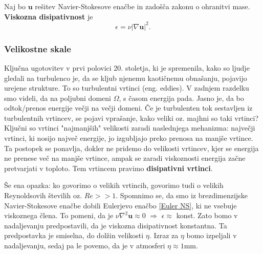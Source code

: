 \documentclass[mat2, tisk]{fmfdelo}
\newcommand{\bd}{\textbf}
\begin{document}
\begin{definicija}
Naj bo $\bd{u}$ rešitev Navier-Stokesove enačbe in zadošča zakonu o ohranitvi mase. \textbf{Viskozna disipativnost} je 
\begin{equation}
\epsilon = \nu|\nabla \bd{u}|^2.
\end{equation}
\end{definicija}

\subsubsection{Velikostne skale}
Ključna ugotovitev v prvi polovici 20. stoletja, ki je spremenila, kako so ljudje gledali 
na turbulenco je, da se kljub njenemu kaotičnemu obnašanju, pojavijo urejene strukture. 
To so turbulentni vrtinci (eng. eddies). V zadnjem razdelku smo videli, da na poljubni domeni 
$\Omega$, s časom energija pada. Jasno je, da bo odtok/prenos energije večji na večji domeni. Če je turbulenten 
tok sestavljen iz turbulentnih vrtincev, se pojavi vprašanje, kako veliki oz. majhni so taki vrtinci? 
Ključni so vrtinci "najmanjših" velikosti zaradi naslednjega mehanizma:
največji vrtinci, ki nosijo največ energije, jo izgubljajo preko prenosa na manjše vrtince. Ta postopek se ponavlja, dokler 
ne pridemo do velikosti vrtincev, kjer se energija ne prenese več na manjše vrtince, 
ampak se zaradi viskoznosti energija začne pretvarjati v toploto. Tem vrtincem pravimo \textbf{disipativni vrtinci}.

Še ena opazka: ko govorimo o velikih vrtincih, govorimo tudi o velikih Reynoldsovih 
številih oz. $Re >> 1$. Spomnimo se, da smo iz brezdimenzijske Navier-Stokesove enačbe 
dobili Eulerjevo enačbo \ref{Euler NS}, ki ne vsebuje viskoznega člena. To pomeni, da je 
$\nu \nabla^2 \bd{u} \approx 0$ $\Longrightarrow$ $\epsilon \approx$ konst. Zato bomo v 
nadaljevanju predpostavili, da je viskozna disipativnost konstantna. Ta predpostavka je 
smiselna, do dolžin velikosti $\eta$. Izraz za $\eta$ bomo izpeljali v nadaljevanju, sedaj 
pa le povemo, da je v atmosferi $\eta \approx 1$mm.\\
\end{document}
